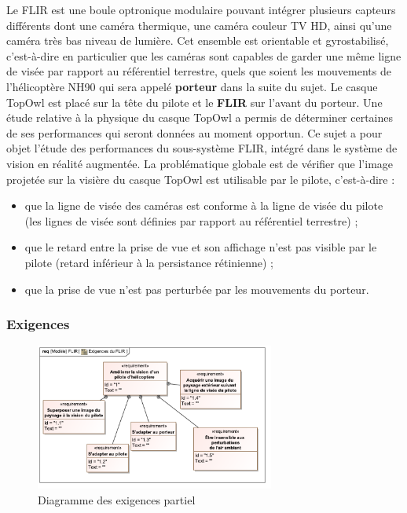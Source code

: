 Le FLIR est une boule optronique modulaire pouvant intégrer plusieurs capteurs différents dont une caméra
thermique, une caméra couleur TV HD, ainsi qu'une caméra très bas niveau de lumière. Cet ensemble est
orientable et gyrostabilisé, c'est-à-dire en particulier que les caméras sont capables de garder une même ligne
de visée par rapport au référentiel terrestre, quels que soient les mouvements de l'hélicoptère NH90 qui sera
appelé \textbf{porteur} dans la suite du sujet. Le casque TopOwl est placé sur la tête du pilote et le \textbf{FLIR} sur l'avant
du porteur.
Une étude relative à la physique du casque TopOwl a permis de déterminer certaines de ses performances qui
seront données au moment opportun. Ce sujet a pour objet l'étude des performances du sous-système FLIR,
intégré dans le système de vision en réalité augmentée. La problématique globale est de vérifier que l'image
projetée sur la visière du casque TopOwl est utilisable par le pilote, c'est-à-dire :
\begin{itemize}
\item  que la ligne de visée des caméras est conforme à la ligne de visée du pilote (les lignes de visée sont définies
par rapport au référentiel terrestre) ;
\item que le retard entre la prise de vue et son affichage n'est pas visible par le pilote (retard inférieur à la
persistance rétinienne) ;
\item que la prise de vue n'est pas perturbée par les mouvements du porteur.
\end{itemize}


\subsubsection{Exigences}

\begin{figure}[!htb]
\begin{center}
\includegraphics[width=0.7\textwidth]{images/req_flir.pdf}
\caption{Diagramme des exigences partiel \label{req_flir}}
\end{center}
\end{figure}



